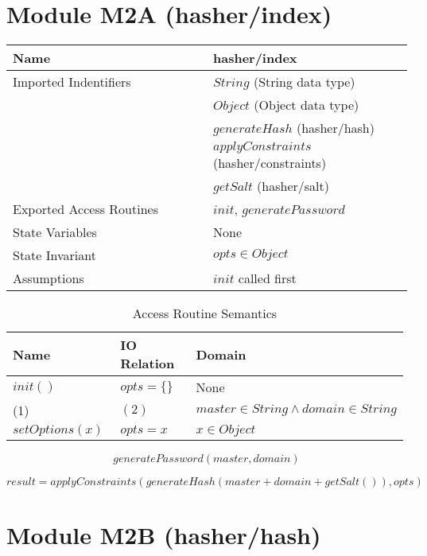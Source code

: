\documentclass[12pt]{article}
\begin{document}
\section{Module M2A (hasher/index)}

\begin{table}[!htbp]
\begin{tabular}{|p{0.5\linewidth} | p{0.5\linewidth}|}
\hline
Name & hasher/index \\
\hline
Imported Indentifiers & $String$ (String data type) \\
& $Object$ (Object data type) \\
& $generateHash$ (hasher/hash)\\
& $applyConstraints$ (hasher/constraints) \\
& $getSalt$ (hasher/salt) \\
\hline
Exported Access Routines & $init$, $generatePassword$ \\
\hline
State Variables & None \\
\hline
State Invariant & $opts \in Object$ \\
\hline
Assumptions & $init$ called first \\
\hline
\end{tabular}
\end{table}

\begin{table}[!htbp]
\caption{Access Routine Semantics}
\begin{tabular}{|p{0.33\linewidth} | p{0.33\linewidth}|p{0.33\linewidth}|}
\hline
Name & IO Relation & Domain \\
\hline
$init()$ & $opts = \{\}$ & None \\
\hline
(1) & $(2)$ & $master \in String \land domain \in String$ \\
\hline
$setOptions(x)$ & $opts = x$ & $x \in Object$ \\
\hline
\end{tabular}
\end{table}

\begin{equation}
generatePassword(master, domain)
\end{equation}

\begin{equation}
result = applyConstraints(generateHash(master+domain+getSalt()), opts)
\end{equation}

\newpage
\section{Module M2B (hasher/hash)}
\end{document}
